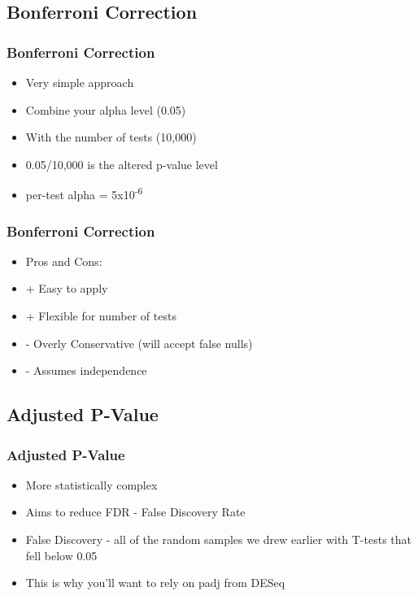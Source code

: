 \documentclass[14pt,handout]{beamer}
\begin{document}
\subsection{Bonferroni Correction}

\begin{frame}
\frametitle{Bonferroni Correction}
\begin{itemize}
	\item<+-> Very simple approach
	\item<+-> Combine your alpha level (0.05)
	\item<+-> With the number of tests (10,000)
	\item<+-> 0.05/10,000 is the altered p-value level
	\item<+-> per-test alpha = 5x10\textsuperscript{-6}
\end{itemize}
\end{frame}

\begin{frame}
\frametitle{Bonferroni Correction}
\begin{itemize}
	\item<+-> Pros and Cons:
	\item<+-> + Easy to apply
	\item<+-> + Flexible for number of tests
	\item<+-> - Overly Conservative (will accept false nulls)
	\item<+-> - Assumes independence
\end{itemize}
\end{frame}

\subsection{Adjusted P-Value}

\begin{frame}
\frametitle{Adjusted P-Value}
\begin{itemize}
	\item<+-> More statistically complex
	\item<+-> Aims to reduce FDR - False Discovery Rate
	\item<+-> False Discovery - all of the random samples we drew earlier with T-tests that fell below 0.05
	\item<+-> This is why you'll want to rely on padj from DESeq
\end{itemize}
\end{frame}
\end{document}
